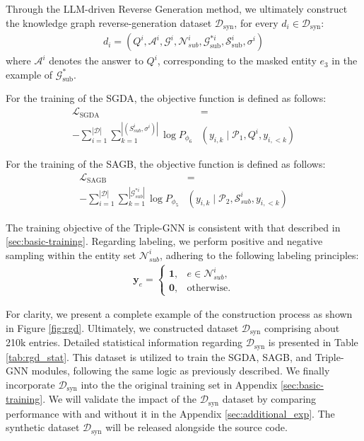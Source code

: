 \documentclass[11pt]{article}
\begin{document}
Through the LLM-driven Reverse Generation method, we ultimately construct the knowledge graph reverse-generation dataset $\mathcal{D}_\text{syn}$, for every $d_i \in \mathcal{D}_\text{syn}$:
\begin{align}
d_i = (Q^i, \mathcal{A}^i, \mathcal{G}^{i}, \mathcal{N}^{i}_{sub}, \mathcal{G}^{*i}_\text{sub}, \mathcal{S}_\text{sub}^i, \sigma^i)
\end{align}
where $\mathcal{A}^i$ denotes the answer to $Q^i$, corresponding to the masked entity $e_3$ in the example of $ \mathcal{G}^{*}_\text{sub} $. 

For the training of the SGDA, the objective function is defined as follows:
\begin{align}
    \mathcal{L}_{\text{SGDA}}&=  \nonumber\\ - \sum_{i=1}^{|\mathcal{D}|} \sum_{k=1}^{|(\textit{S}^i_{sub}, \sigma^i)|} \log P_{\phi_6}&(y_{i,k} \mid \mathcal{P}_1, Q^i, y_{i,<k})
\end{align}

For the training of the SAGB, the objective function is defined as follows:
\begin{align}
    \mathcal{L}_{\text{SAGB}} &= \nonumber\\ - \sum_{i=1}^{|\mathcal{D}|} \sum_{k=1}^{|\mathcal{G}^{*i}_{sub}|} \log P_{\phi_5}&(y_{i,k} \mid \mathcal{P}_2, \mathcal{S}_{sub}^i, y_{i,<k})
\end{align}

The training objective of the Triple-GNN is consistent with that described in \ref{sec:basic-training}. Regarding labeling, we perform positive and negative sampling within the entity set $\mathcal{N}^{i}_{sub}$, adhering to the following labeling principles:
\begin{align}
\boldsymbol{y}_{e} = \begin{cases} 
\boldsymbol{1}, & e \in \mathcal{N}^i_{sub}, \\
\boldsymbol{0}, & \text{otherwise}.
\end{cases}
\end{align}

For clarity, we present a complete example of the construction process as shown in Figure \ref{fig:rgd}. Ultimately, we constructed dataset $\mathcal{D}_\text{syn}$ comprising about 210k entries. Detailed statistical information regarding $\mathcal{D}_\text{syn}$ is presented in Table \ref{tab:rgd_stat}. This dataset is utilized to train the SGDA, SAGB, and Triple-GNN modules, following the same logic as previously described. We finally incorporate $\mathcal{D}_\text{syn}$ into the the original training set in Appendix \ref{sec:basic-training}. We will validate the impact of the $\mathcal{D}_\text{syn}$ dataset by comparing performance with and without it in the Appendix \ref{sec:additional_exp}. The synthetic dataset $\mathcal{D}_\text{syn}$ will be released alongside the source code.
\end{document}
